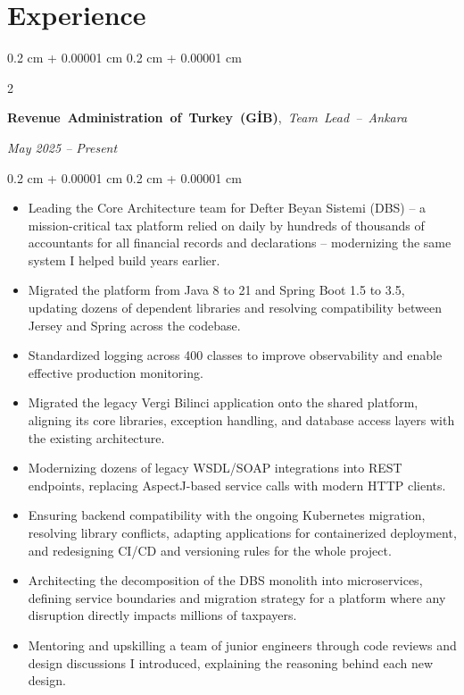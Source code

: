 \documentclass[10pt, letterpaper]{article}
\newenvironment{highlights}{
    \begin{itemize}[
        topsep=0.10 cm,
        parsep=0.10 cm,
        partopsep=0pt,
        itemsep=0pt,
        leftmargin=0.4 cm + 10pt
    ]
}{
    \end{itemize}
} %
\newenvironment{onecolentry}{
    \begin{adjustwidth}{
        0.2 cm + 0.00001 cm
    }{
        0.2 cm + 0.00001 cm
    }
}{
    \end{adjustwidth}
} %
\newenvironment{twocolentry}[2][]{
    \onecolentry
    \def\secondColumn{#2}
    \setcolumnwidth{\fill, 4.5 cm}
    \begin{paracol}{2}
}{
    \switchcolumn \raggedleft \secondColumn
    \end{paracol}
    \endonecolentry
} %
\begin{document}
    
    \section{Experience}

        \begin{twocolentry}{
        \textit{May 2025 – Present}}
            \mbox{\textbf{Revenue Administration of Turkey (GİB)},
            \textit{Team Lead -- Ankara}
            }
        \end{twocolentry}

        \vspace{0.10 cm}
        \begin{onecolentry}
            \begin{highlights}
            \item Leading the Core Architecture team for Defter Beyan Sistemi (DBS) -- a mission-critical tax platform relied on daily by hundreds of thousands of accountants for all financial records and declarations -- modernizing the same system I helped build years earlier.
\item Migrated the platform from Java 8 to 21 and Spring Boot 1.5 to 3.5, updating dozens of dependent libraries and resolving compatibility between Jersey and Spring across the codebase.
\item Standardized logging across \raisebox{0.3ex}{\scalebox{0.7}{$\sim$}}400 classes to improve observability and enable effective production monitoring.
\item Migrated the legacy Vergi Bilinci application onto the shared platform, aligning its core libraries, exception handling, and database access layers with the existing architecture.
\item Modernizing dozens of legacy WSDL/SOAP integrations into REST endpoints, replacing AspectJ-based service calls with modern HTTP clients.
\item Ensuring backend compatibility with the ongoing Kubernetes migration, resolving library conflicts, adapting applications for containerized deployment, and redesigning CI/CD and versioning rules for the whole project.
\item Architecting the decomposition of the DBS monolith into microservices, defining service boundaries and migration strategy for a platform where any disruption directly impacts millions of taxpayers.
\item Mentoring and upskilling a team of junior engineers through code reviews and design discussions I introduced, explaining the reasoning behind each new design.
            \end{highlights}
        \end{onecolentry}
\end{document}
